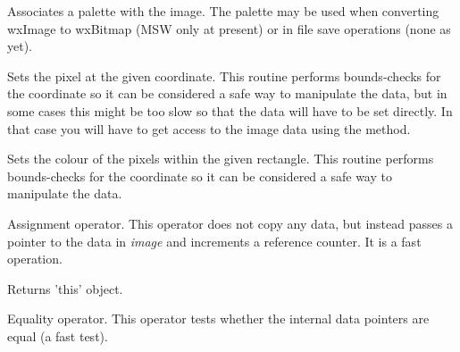 
Associates a palette with the image. The palette may be used when converting
wxImage to wxBitmap (MSW only at present) or in file save operations (none as yet).


\label{wximagesetrgb}


Sets the pixel at the given coordinate. This routine performs bounds-checks
for the coordinate so it can be considered a safe way to manipulate the
data, but in some cases this might be too slow so that the data will have to
be set directly. In that case you will have to get access to the image data 
using the  method.


\label{wximagesetrgbrect}


Sets the colour of the pixels within the given rectangle. This routine performs
bounds-checks for the coordinate so it can be considered a safe way to manipulate the
data.


\label{wximageassign}


Assignment operator. This operator does not copy any data, but instead
passes a pointer to the data in {\it image} and increments a reference
counter. It is a fast operation.




Returns 'this' object.


\label{wximageequal}


Equality operator. This operator tests whether the internal data pointers are
equal (a fast test).



